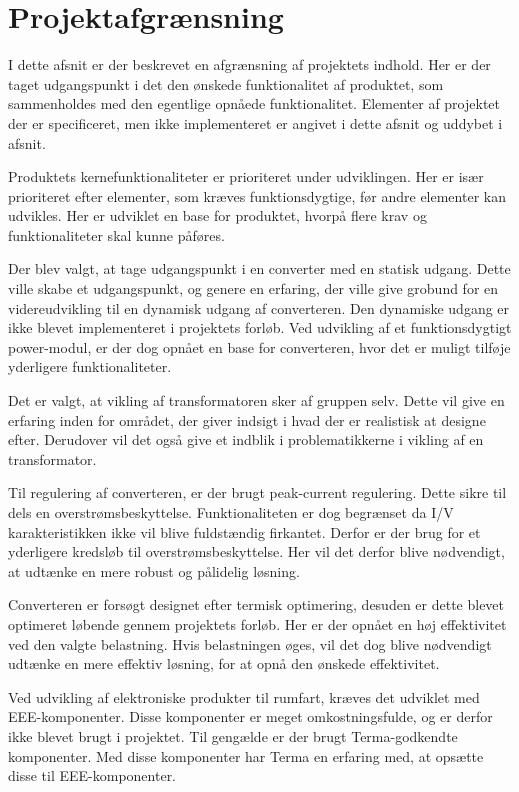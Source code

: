 
\chapter{Projektafgrænsning}
I dette afsnit er der beskrevet en afgrænsning af projektets indhold. Her er der taget udgangspunkt i det den ønskede funktionalitet af produktet, som sammenholdes med den egentlige opnåede funktionalitet. Elementer af projektet der er specificeret, men ikke implementeret er angivet i dette afsnit og uddybet i afsnit. 

Produktets kernefunktionaliteter er prioriteret under udviklingen. Her er især prioriteret efter elementer, som kræves funktionsdygtige, før andre elementer kan udvikles. Her er udviklet en base for produktet, hvorpå flere krav og funktionaliteter skal kunne påføres.

Der blev valgt, at tage udgangspunkt i en converter med en statisk udgang. Dette ville skabe et udgangspunkt, og genere en erfaring, der ville give grobund for en videreudvikling til en dynamisk udgang af converteren. Den dynamiske udgang er ikke blevet implementeret i projektets forløb. Ved udvikling af et funktionsdygtigt power-modul, er der dog opnået en base for converteren, hvor det er muligt tilføje yderligere funktionaliteter. 

Det er valgt, at vikling af transformatoren sker af gruppen selv. Dette vil give en erfaring inden for området, der giver indsigt i hvad der er realistisk at designe efter. Derudover vil det også give et indblik i problematikkerne i vikling af en transformator. 

Til regulering af converteren, er der brugt peak-current regulering. Dette sikre til dels en overstrømsbeskyttelse. Funktionaliteten er dog begrænset da I/V karakteristikken ikke vil blive fuldstændig firkantet. Derfor er der brug for et yderligere kredsløb til overstrømsbeskyttelse. Her vil det derfor blive nødvendigt, at udtænke en mere robust og pålidelig løsning. 

Converteren er forsøgt designet efter termisk optimering, desuden er dette blevet optimeret løbende gennem projektets forløb. Her er der opnået en høj effektivitet ved den valgte belastning. Hvis belastningen øges, vil det dog blive nødvendigt udtænke en mere effektiv løsning, for at opnå den ønskede effektivitet. 

Ved udvikling af elektroniske produkter til rumfart, kræves det udviklet med EEE-komponenter. Disse komponenter er meget omkostningsfulde, og er derfor ikke blevet brugt i projektet. Til gengælde er der brugt Terma-godkendte komponenter. Med disse komponenter har Terma en erfaring med, at opsætte disse til EEE-komponenter.  

